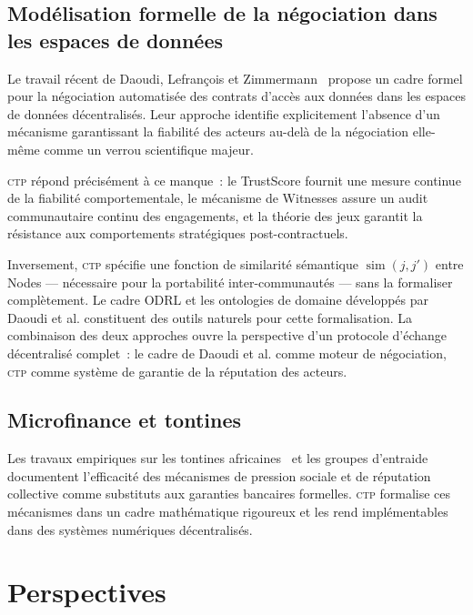 \documentclass[12pt,a4paper]{article}
\theoremstyle{definition}
\theoremstyle{plain}
\theoremstyle{remark}
\newcommand{\CTP}{\textsc{ctp}}
\newcommand{\1}{\mathbf{1}}
\begin{document}
\subsection{Modélisation formelle de la négociation dans les espaces de données}

Le travail récent de Daoudi, Lefrançois et Zimmermann~\cite{daoudi2026negotiation}
propose un cadre formel pour la négociation automatisée des contrats d'accès
aux données dans les espaces de données décentralisés. Leur approche identifie
explicitement l'absence d'un mécanisme garantissant la fiabilité des acteurs
au-delà de la négociation elle-même comme un verrou scientifique majeur.

\CTP{} répond précisément à ce manque~: le TrustScore fournit une mesure
continue de la fiabilité comportementale, le mécanisme de Witnesses assure
un audit communautaire continu des engagements, et la théorie des jeux
garantit la résistance aux comportements stratégiques post-contractuels.

Inversement, \CTP{} spécifie une fonction de similarité sémantique
$\operatorname{sim}(j, j')$ entre Nodes --- nécessaire pour la portabilité
inter-communautés --- sans la formaliser complètement. Le cadre ODRL et les
ontologies de domaine développés par Daoudi et al. constituent des outils
naturels pour cette formalisation. La combinaison des deux approches ouvre
la perspective d'un protocole d'échange décentralisé complet~: le cadre
de Daoudi et al. comme moteur de négociation, \CTP{} comme système de
garantie de la réputation des acteurs.

\subsection{Microfinance et tontines}

Les travaux empiriques sur les tontines africaines~\cite{ardener1964rotating}
et les groupes d'entraide~\cite{besley1993rotating} documentent l'efficacité
des mécanismes de pression sociale et de réputation collective comme
substituts aux garanties bancaires formelles. \CTP{} formalise ces mécanismes
dans un cadre mathématique rigoureux et les rend implémentables dans des
systèmes numériques décentralisés.

\section{Perspectives}
\label{sec:conclusion}
\end{document}
